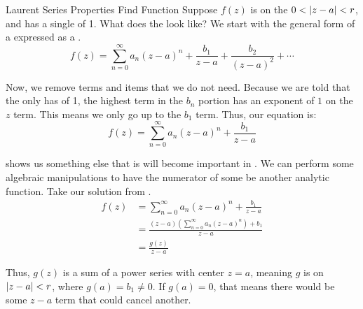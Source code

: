 \begin{example}{Laurent Series Properties Find Function}
  Suppose $f(z)$ is  on the  $0 < \left\lvert z-a \right\rvert < r$, and has a single  of  1.
  What does the  look like?
  \tcblower{}
  We start with the general form of a  expressed as a .
  \begin{equation*}
    f(z) = \sum_{n=0}^{\infty} a_{n} {(z-a)}^{n} + \frac{b_{1}}{z-a} + \frac{b_{2}}{{(z-a)}^{2}} + \cdots
  \end{equation*}

  Now, we remove terms and items that we do not need.
  Because we are told that the only  has  of 1, the highest term in the $b_{n}$ portion has an exponent of $1$ on the $z$ term.
  This means we only go up to the $b_{1}$ term.
  Thus, our equation is:
  \begin{equation*}
    f(z) = \sum_{n=0}^{\infty} a_{n} {(z-a)}^{n} + \frac{b_{1}}{z-a}
  \end{equation*}
\end{example}

 shows us something else that is will become important in .
We can perform some algebraic manipulations to have the numerator of some   be another analytic function.
Take our solution from .
\begin{align*}
  f(z) &= \sum_{n=0}^{\infty} a_{n} {(z-a)}^{n} + \frac{b_{1}}{z-a} \\
       &= \frac{(z-a) \left( \sum_{n=0}^{\infty} a_{n} {(z-a)}^{n} \right) + b_{1}}{z-a} \\
       &= \frac{g(z)}{z-a}
\end{align*}

Thus, $g(z)$ is a sum of a power series with center $z=a$, meaning $g$ is  on $\left\lvert z-a \right\rvert < r$, where $g(a) = b_{1} \neq 0$.
If $g(a) = 0$, that means there would be some $z-a$ term that could cancel another.

